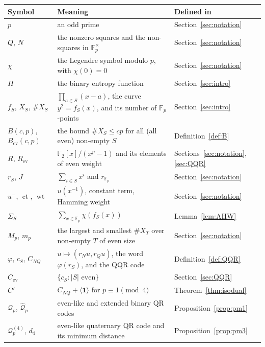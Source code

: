 \documentclass[12pt,letterpaper]{article}
\theoremstyle{definition}
\theoremstyle{remark}
\numberwithin{equation}{section}
\newcommand{\F}{\mathbb{F}}
\newcommand{\Fp}{\mathbb{F}_p}
\newcommand{\wt}{\operatorname{wt}}
\newcommand{\ct}{\operatorname{ct}}
\newcommand{\CNQ}{C_{NQ}}
\newcommand{\Cev}{C_{\mathrm{ev}}}
\newcommand{\X}{\#X}
\begin{document}
\begin{center}\small
\begin{tabular}{@{}l>{\raggedright\arraybackslash}p{}l@{}}
\toprule
Symbol & Meaning & Defined in\\
\midrule
$p$ & an odd prime & Section~\ref{sec:notation}\\
$Q$, $N$ & the nonzero squares and the non-squares in $\Fp^\times$ & Section~\ref{sec:notation}\\
$\chi$ & the Legendre symbol modulo $p$, with $\chi(0)=0$ & Section~\ref{sec:notation}\\
$H$ & the binary entropy function & Section~\ref{sec:intro}\\
$f_S$, $X_S$, $\X_S$ & $\prod_{a\in S}(x-a)$, the curve $y^2=f_S(x)$, and its number of $\Fp$-points & Section~\ref{sec:intro}\\
$B(c,p)$, $B_{\mathrm{ev}}(c,p)$ & the bound $\X_S\le cp$ for all (all even) non-empty $S$ & Definition~\ref{def:B}\\
$R$, $R_{\mathrm{ev}}$ & $\F_2[x]/(x^p-1)$ and its elements of even weight & Sections~\ref{sec:notation}, \ref{sec:QQR}\\
$r_S$, $J$ & $\sum_{i\in S}x^i$ and $r_{\Fp}$ & Section~\ref{sec:notation}\\
$u^-$, $\ct$, $\wt$ & $u(x^{-1})$, constant term, Hamming weight & Section~\ref{sec:notation}\\
$\Sigma_S$ & $\sum_{x\in\Fp}\chi(f_S(x))$ & Lemma~\ref{lem:AHW}\\
$M_p$, $m_p$ & the largest and smallest $\X_T$ over non-empty $T$ of even size & Section~\ref{sec:notation}\\
$\varphi$, $c_S$, $\CNQ$ & $u\mapsto(r_Nu,r_Qu)$, the word $\varphi(r_S)$, and the QQR code & Definition~\ref{def:QQR}\\
$\Cev$ & $\{c_S:|S|\text{ even}\}$ & Section~\ref{sec:QQR}\\
$C'$ & $\CNQ+\langle\mathbf 1\rangle$ for $p\equiv1\pmod4$ & Theorem~\ref{thm:isodual}\\
$\mathcal Q_p$, $\widehat{\mathcal Q}_p$ & even-like and extended binary QR codes & Proposition~\ref{prop:pm1}\\
$\mathcal Q^{(4)}_p$, $d_4$ & even-like quaternary QR code and its minimum distance & Proposition~\ref{prop:pm3}\\
\bottomrule
\end{tabular}
\end{center}

\end{document}
